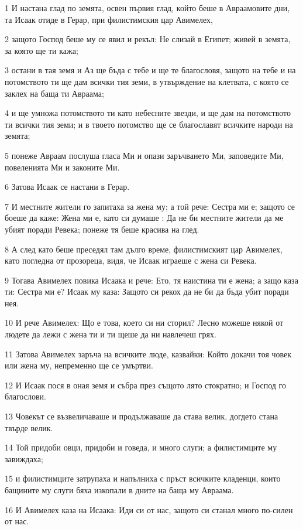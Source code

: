 \par 1 И настана глад по земята, освен първия глад, който беше в Авраамовите дни, та Исаак отиде в Герар, при филистимския цар Авимелех,
\par 2 защото Господ беше му се явил и рекъл: Не слизай в Египет; живей в земята, за която ще ти кажа;
\par 3 остани в тая земя и Аз ще бъда с тебе и ще те благословя, защото на тебе и на потомството ти ще дам всички тия земи, в утвърждение на клетвата, с която се заклех на баща ти Авраама;
\par 4 и ще умножа потомството ти като небесните звезди, и ще дам на потомството ти всички тия земи; и в твоето потомство ще се благославят всичките народи на земята;
\par 5 понеже Авраам послуша гласа Ми и опази заръчването Ми, заповедите Ми, повеленията Ми и законите Ми.
\par 6 Затова Исаак се настани в Герар.
\par 7 И местните жители го запитаха за жена му; а той рече: Сестра ми е; защото се боеше да каже: Жена ми е, като си думаше : Да не би местните жители да ме убият поради Ревека; понеже тя беше красива на глед.
\par 8 А след като беше преседял там дълго време, филистимският цар Авимелех, като погледна от прозореца, видя, че Исаак играеше с жена си Ревека.
\par 9 Тогава Авимелех повика Исаака и рече: Ето, тя наистина ти е жена; а защо каза ти: Сестра ми е? Исаак му каза: Защото си рекох да не би да бъда убит поради нея.
\par 10 И рече Авимелех: Що е това, което си ни сторил? Лесно можеше някой от людете да лежи с жена ти и ти щеше да ни навлечеш грях.
\par 11 Затова Авимелех заръча на всичките люде, казвайки: Който докачи тоя човек или жена му, непременно ще се умъртви.
\par 12 И Исаак пося в оная земя и събра през същото лято стократно; и Господ го благослови.
\par 13 Човекът се възвеличаваше и продължаваше да става велик, догдето стана твърде велик.
\par 14 Той придоби овци, придоби и говеда, и много слуги; а филистимците му завиждаха;
\par 15 и филистимците затрупаха и напълниха с пръст всичките кладенци, които бащините му слуги бяха изкопали в дните на баща му Авраама.
\par 16 И Авимелех каза на Исаака: Иди си от нас, защото си станал много по-силен от нас.
